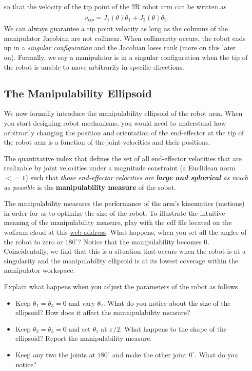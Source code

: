% 
so that the velocity of the tip point of the 2R robot arm can be written as 
%
\begin{align}
	v_{tip} = J_1(\theta)\dot{\theta}_1 + J_2(\theta)\dot{\theta}_2.
\end{align}
%
We can always guarantee a tip point velocity as long as the columns of the manipulator Jacobian are not collinear. When collinearity occurs, the robot ends up in a \textit{singular configuration} and the Jacobian loses rank (more on this later on). Formally, we say a manipulator is in a singular configuration when the tip of the robot is unable to move arbitrarily in specific directions.

\subsection{The Manipulability Ellipsoid}
%
We now formally introduce the manipulability ellipsoid of the robot arm. When you start designing robot mechanisms, you would need to understand how arbitrarily changing the position and orientation of the end-effector at the tip of the robot arm is a function of the joint velocities and their positions. 
\begin{definition}
	The quantitative index that defines the set of all end-effector velocities that are realizable by joint velocities under a magnitude constraint (\eg a Euclidean norm  $<=1$) such that \textit{those end-effector velocities are \textbf{large and spherical} as much as possible} is the \textbf{manipulability measure} of the robot.
\end{definition}

The manipulability measures the performance of the arm's kinematics (motions) in order for us to optimize the size of the robot. To illustrate the intuitive meaning of the manipulability measure, play with the cdf file located on the wolfram cloud at this \href{https://demonstrations.wolfram.com/ManipulabilityEllipsoidOfARobotArm/}{web address}. What happens, when you set all the angles of the robot to zero or $180^\circ$? Notice that the manipulability becomes $0$. Coincidentally, we find that this is a situation that occurs when the robot is at a singularity and the manipulability ellipsoid is at its lowest coverage within the manipulator workspace.

\begin{homework}
	Explain what happens when you adjust the parameters of the robot as follows 
	\begin{itemize}
		\item Keep $\theta_1 = \theta_3 = 0$ and vary $\theta_2$. What do you notice about the size of the ellipsoid? How does it affect the mannipulability measure? 
		\item Keep $\theta_2 = \theta_3 = 0$ and set $\theta_1$ at $\pi/2$. What happens to the shape of the ellipsoid? Report the manipulability measure.
		\item Keep any  two the joints at $180^\circ$ and make the other joint $0^\circ$. What do you notice?
	\end{itemize}
\end{homework}

